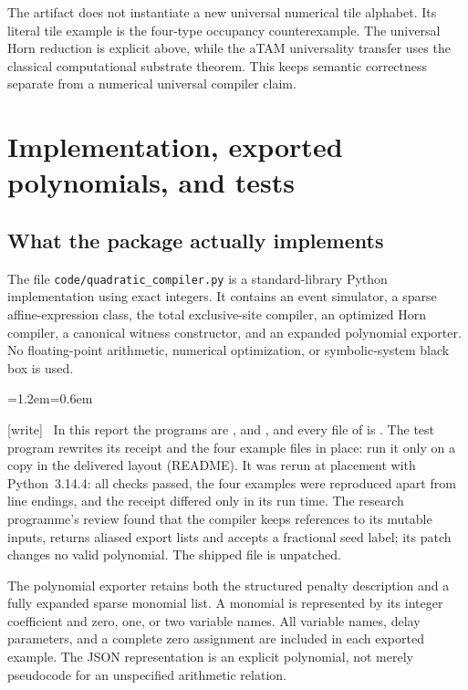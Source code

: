\documentclass[11pt,letterpaper]{article}
\theoremstyle{definition}
\theoremstyle{remark}
\newcommand{\code}[1]{\nolinkurl{#1}}
\newcommand{\wtag}{\textup{[write]}}
\newenvironment{writenote}{\par\smallskip\begin{list}{}{\leftmargin=1.2em\rightmargin=0.6em}\item[]\small\wtag\ }{\end{list}\smallskip}
\begin{document}
The artifact does not instantiate a new universal numerical tile alphabet.
Its literal tile example is the four-type occupancy counterexample. The
universal Horn reduction is explicit above, while the aTAM universality
transfer uses the classical computational substrate theorem. This keeps
semantic correctness separate from a numerical universal compiler claim.

\section{Implementation, exported polynomials, and tests}\label{qoc:ts:sec:impl}
\subsection{What the package actually implements}
The file \code{code/quadratic_compiler.py} is a standard-library Python
implementation using exact integers. It contains an event simulator, a
sparse affine-expression class, the total exclusive-site compiler, an
optimized Horn compiler, a canonical witness constructor, and an expanded
polynomial exporter. No floating-point arithmetic, numerical optimization,
or symbolic-system black box is used.

\begin{writenote}
In this report the programs are ,  and , and every file of  is . The test program rewrites its receipt and the four example files in place: run it only on a copy in the delivered layout (README). It was rerun at placement with Python~3.14.4: all checks passed, the four examples were reproduced apart from line endings, and the receipt differed only in its run time. The research programme's review found that the compiler keeps references to its mutable inputs, returns aliased export lists and accepts a fractional seed label; its patch  changes no valid polynomial. The shipped file is unpatched.
\end{writenote}

The polynomial exporter retains both the structured penalty description
and a fully expanded sparse monomial list. A monomial is represented by
its integer coefficient and zero, one, or two variable names. All variable
names, delay parameters, and a complete zero assignment are included in
each exported example. The JSON representation is an explicit polynomial,
not merely pseudocode for an unspecified arithmetic relation.
\end{document}
